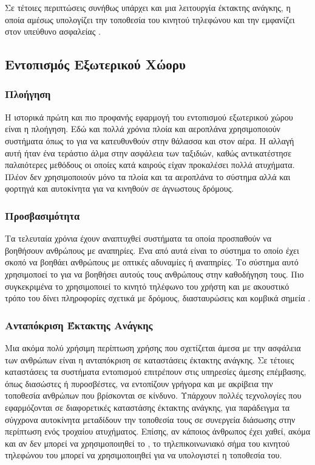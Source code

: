 Σε τέτοιες περιπτώσεις συνήθως υπάρχει και μια λειτουργία έκτακτης ανάγκης, η οποία αμέσως υπολογίζει την τοποθεσία του κινητού τηλεφώνου και την εμφανίζει στον υπεύθυνο ασφαλείας \cite{bernard}.

\subsection{Εντοπισμός Εξωτερικού Χώορυ}
\subsubsection{Πλοήγηση}
Η ιστορικά πρώτη και πιο προφανής εφαρμογή του εντοπισμού εξωτερικού χώρου είναι η πλοήγηση. Εδώ και πολλά χρόνια πλοία και αεροπλάνα χρησιμοποιούν συστήματα όπως το
 για να κατευθυνθούν στην θάλασσα και στον αέρα. Η αλλαγή αυτή ήταν ένα τεράστιο άλμα στην ασφάλεια των ταξιδιών, καθώς αντικατέστησε παλαιότερες μεθόδους
οι οποίες κατά καιρούς είχαν προκαλέσει πολλά ατυχήματα.
Πλέον δεν χρησιμοποιούν μόνο τα πλοία και τα αεροπλάνα το σύστημα  αλλά και φορτηγά και αυτοκίνητα για να κινηθούν σε άγνωστους δρόμους.
\subsubsection{Προσβασιμότητα}
Τα τελευταία χρόνια έχουν αναπτυχθεί συστήματα τα οποία προσπαθούν να βοηθήσουν ανθρώπους με αναπηρίες. Ένα από αυτά είναι το σύστημα  το οποίο
έχει σκοπό να βοηθάει ανθρώπους με οπτικές αδυναμίες ή αναπηρίες. Το σύστημα αυτό χρησιμοποεί το  για να βοηθήσει αυτούς τους ανθρώπους στην καθοδήγηση τους.
Πιο συγκεκριμένα το  χρησιμοποιεί το κινητό τηλέφωνο του χρήστη και με ακουστικό τρόπο του δίνει πληροφορίες σχετικά με δρόμους, διασταυρώσεις
και κομβικά σημεία \cite{bernard}.
\subsubsection{Ανταπόκριση Έκτακτης Ανάγκης}
Μια ακόμα πολύ χρήσιμη περίπτωση χρήσης που σχετίζεται άμεσα με την ασφάλεια των ανθρώπων είναι η ανταπόκριση σε καταστάσεις έκτακτης ανάγκης.
Σε τέτοιες καταστάσεις τα συστήματα εντοπισμού επιτρέπουν στις υπηρεσίες άμεσης επέμβασης, όπως διασώστες ή πυροσβέστες, να εντοπίζουν γρήγορα και με
ακρίβεια την τοποθεσία ανθρώπων που βρίσκονται σε κίνδυνο. Υπάρχουν πολλές τεχνολογίες που εφαρμόζονται σε διαφορετικές καταστάσης έκτακτης ανάγκης, για παράδειγμα
τα σύγχρονα αυτοκίνητα μεταδίδουν την τοποθεσία τους σε συνεργεία διάσωσης στην περίπτωση ενός τροχαίου ατυχήματος. Επίσης, αν κάποιος άνθρωπος έχει
χαθεί, ακόμα και αν δεν μπορεί να χρησιμοποιηθεί το , το τηλεπικοινωνιακό σήμα του κινητού τηλεφώνου του μπορεί να χρησιμοποιηθεί για να υπολογιστεί
η τοποθεσία του.
